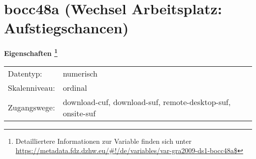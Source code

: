 
    \setcounter{footnote}{0}

    \vspace*{-1.8cm}
	\section{bocc48a (Wechsel Arbeitsplatz: Aufstiegschancen)}
	\label{section:bocc48a}



    \vspace*{0.5cm}
    \noindent\textbf{Eigenschaften
	\footnote{Detailliertere Informationen zur Variable finden sich unter
		\url{https://metadata.fdz.dzhw.eu/\#!/de/variables/var-gra2009-ds1-bocc48a$}}}\\
	\begin{tabularx}{\hsize}{@{}lX}
	Datentyp: & numerisch \\
	Skalenniveau: & ordinal \\
	Zugangswege: &
	  download-cuf, 
	  download-suf, 
	  remote-desktop-suf, 
	  onsite-suf
 \\
    \end{tabularx}



